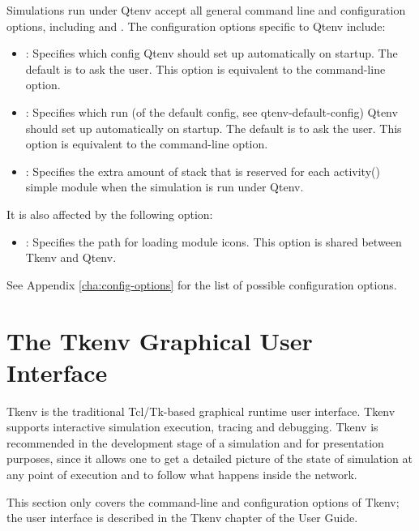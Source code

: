 Simulations run under Qtenv accept all general command line
and configuration options, including  and . 
The configuration options specific to Qtenv include:

\begin{itemize}
  \item {}:
    Specifies which config Qtenv should set up automatically on
    startup. The default is to ask the user. This option is equivalent to the
     command-line option.

  \item {}: Specifies which run (of the default
    config, see qtenv-default-config) Qtenv should set up automatically on startup.
    The default is to ask the user. This option is equivalent to the 
    command-line option.

  \item {}:
    Specifies the extra amount of stack that is reserved for each activity()
    simple module when the simulation is run under Qtenv.
\end{itemize}

It is also affected by the following option:

\begin{itemize}
  \item {}: Specifies the path for loading module icons.
  This option is shared between Tkenv and Qtenv.
\end{itemize}

See Appendix \ref{cha:config-options} for the list of possible configuration options.



\section{The Tkenv Graphical User Interface}
\label{sec:run-sim:tkenv}

Tkenv is the traditional Tcl/Tk-based graphical runtime user
interface. Tkenv supports interactive simulation execution, tracing and
debugging. Tkenv is recommended in the development stage of a simulation and for
presentation purposes, since it allows one to get a detailed picture of the state
of simulation at any point of execution and to follow what happens
inside the network.

\begin{note}
  This section only covers the command-line and configuration options
  of Tkenv; the user interface is described in the Tkenv chapter of the
  {\opp} User Guide.
\end{note}

